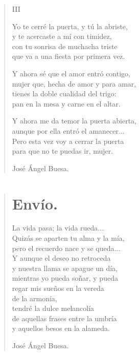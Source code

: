 \documentclass[11pt, portrait, twoside, notitlepage, openright]{book}
\begin{document}
\begin{verse}
\begin{center}
III
\end{center}

Yo te cerré la puerta, y tú la abriste,\\
y te acercaste a mí con timidez,\\
con tu sonrisa de muchacha triste\\
que va a una fiesta por primera vez.
\newline

Y ahora sé que el amor entró contigo,\\
mujer que, hecha de amor y para amar,\\
tienes la doble cualidad del trigo:\\
pan en la mesa y carne en el altar.
\newline

Y ahora me da temor la puerta abierta,\\
aunque por ella entró el amanecer...\\
Pero esta vez voy a cerrar la puerta\\
para que no te puedas ir, mujer.
\newline

José Ángel Buesa.
\end{verse}

\newpage
\begin{verse}
\begin{center}
\section{Envío.}
\end{center}
La vida pasa; la vida rueda...\\
Quizás se aparten tu alma y la mía,\\
pero el recuerdo nace y se queda...\\
Y aunque el deseo no retroceda\\
y nuestra llama se apague un día,\\
mientras yo pueda soñar, y pueda\\
regar mis sueños en la vereda\\
de la armonía,\\
tendré la dulce melancolía\\
de aquellas frases entre la umbría\\
y aquellos besos en la alameda.

José Ángel Buesa.
\end{verse}
\end{document}
